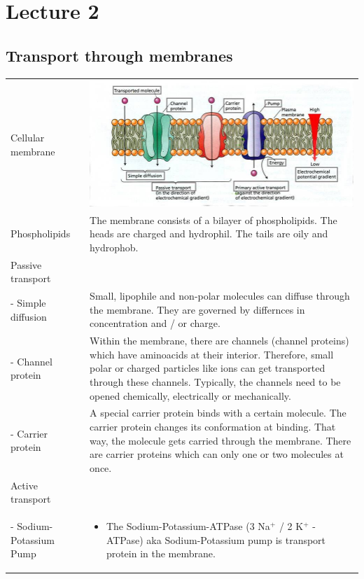 \section{Lecture 2}

\subsection{Transport through membranes}
\begin{longtable}{p{4cm}p{15cm}}
Cellular membrane	& \includegraphics[width = 14cm]{neuroinf_membrane.jpg}\\
Phospholipids		& The membrane consists of a bilayer of phospholipids. The heads are charged and hydrophil. The tails are oily and hydrophob.\\
Passive transport	&\\
- Simple diffusion	& Small, lipophile and non-polar molecules can diffuse through the membrane. They are governed by differnces in concentration and / or charge.\\
- Channel protein	& Within the membrane, there are channels (channel proteins) which have aminoacids at their interior. Therefore, small polar or charged particles like ions can get transported through these channels. Typically, the channels need to be opened chemically, electrically or mechanically.\\
- Carrier protein	& A special carrier protein binds with a certain molecule. The carrier protein changes its conformation at binding. That way, the molecule gets carried through the membrane. There are carrier proteins which can only one or two molecules at once.\\
Active transport	&\\
- Sodium-Potassium Pump	& \begin{itemize}
                       	  	\item The Sodium-Potassium-ATPase (3 Na$^+$ / 2 K$^+$ - ATPase) aka Sodium-Potassium pump is transport protein in the membrane.

\end{itemize}
\end{longtable}
